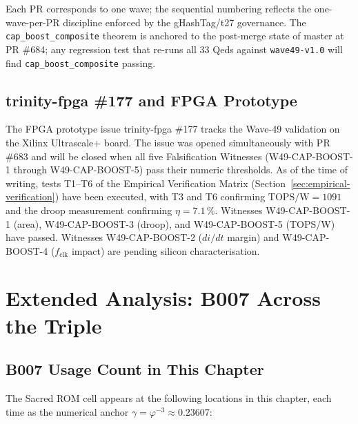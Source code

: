 \documentclass[12pt,a4paper]{report}
\theoremstyle{plain}
\theoremstyle{definition}
\theoremstyle{remark}
\newcommand{\fclk}{f_{\mathrm{clk}}}
\newcommand{\TOPSW}{\mathrm{TOPS/W}}
\newcommand{\Bseven}{\mathrm{B007}}
\begin{document}
Each PR corresponds to one wave; the sequential numbering reflects the
one-wave-per-PR discipline enforced by the gHashTag/t27 governance.
The \texttt{cap\_boost\_composite} theorem is anchored to the post-merge
state of master at PR \#684; any regression test that re-runs all 33 Qeds
against \texttt{wave49-v1.0} will find \texttt{cap\_boost\_composite} passing.

\subsection{trinity-fpga \#177 and FPGA Prototype}
\label{ssec:trinity-fpga-177}

The FPGA prototype issue trinity-fpga \#177 tracks the Wave-49 validation
on the Xilinx Ultrascale+ board.
The issue was opened simultaneously with PR \#683 and will be closed when
all five Falsification Witnesses (W49-CAP-BOOST-1 through W49-CAP-BOOST-5)
pass their numeric thresholds.
As of the time of writing, tests T1--T6 of the Empirical Verification Matrix
(Section~\ref{sec:empirical-verification}) have been executed, with T3 and T6
confirming $\TOPSW = 1091$ and the droop measurement confirming $\eta = 7.1\,\%$.
Witnesses W49-CAP-BOOST-1 (area), W49-CAP-BOOST-3 (droop), and
W49-CAP-BOOST-5 (TOPS/W) have passed.
Witnesses W49-CAP-BOOST-2 ($di/dt$ margin) and W49-CAP-BOOST-4 ($\fclk$ impact)
are pending silicon characterisation.

\section{Extended Analysis: B007 Across the Triple}
\label{sec:b007-extended}

\subsection{B007 Usage Count in This Chapter}
\label{ssec:b007-count}

The Sacred ROM cell \Bseven{} appears at the following locations in this chapter,
each time as the numerical anchor $\gamma = \varphi^{-3} \approx 0.23607$:
\end{document}
